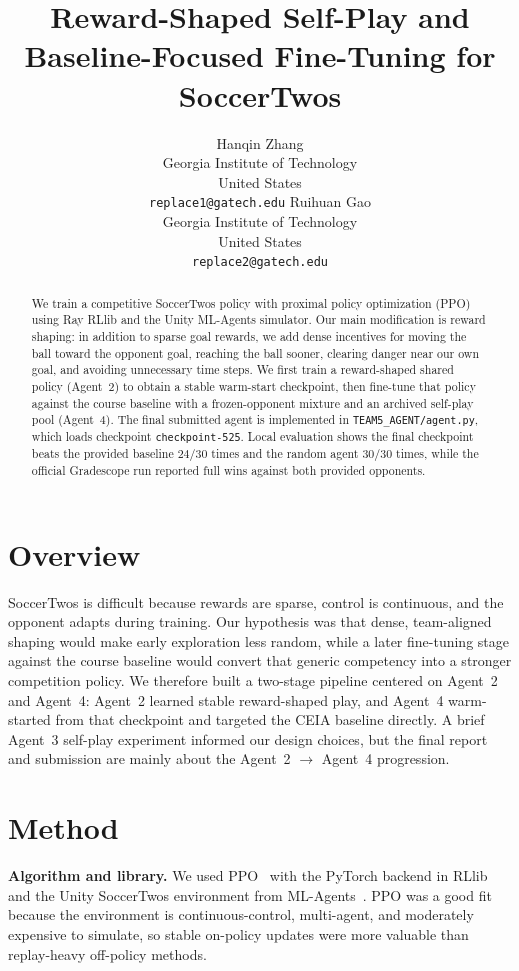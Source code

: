 \documentclass{article}
\title{Reward-Shaped Self-Play and Baseline-Focused Fine-Tuning for SoccerTwos}
\author{
  Hanqin Zhang\\
  Georgia Institute of Technology\\
  United States\\
  \texttt{replace1@gatech.edu}
  \And
  Ruihuan Gao\\
  Georgia Institute of Technology\\
  United States\\
  \texttt{replace2@gatech.edu}
}
\begin{document}
\maketitle

\begin{abstract}
We train a competitive SoccerTwos policy with proximal policy optimization (PPO) using Ray RLlib and the Unity ML-Agents simulator. Our main modification is reward shaping: in addition to sparse goal rewards, we add dense incentives for moving the ball toward the opponent goal, reaching the ball sooner, clearing danger near our own goal, and avoiding unnecessary time steps. We first train a reward-shaped shared policy (Agent~2) to obtain a stable warm-start checkpoint, then fine-tune that policy against the course baseline with a frozen-opponent mixture and an archived self-play pool (Agent~4). The final submitted agent is implemented in \texttt{TEAM5\_AGENT/agent.py}, which loads checkpoint \texttt{checkpoint-525}. Local evaluation shows the final checkpoint beats the provided baseline $24/30$ times and the random agent $30/30$ times, while the official Gradescope run reported full wins against both provided opponents.
\end{abstract}


\section{Overview}
SoccerTwos is difficult because rewards are sparse, control is continuous, and the opponent adapts during training. Our hypothesis was that dense, team-aligned shaping would make early exploration less random, while a later fine-tuning stage against the course baseline would convert that generic competency into a stronger competition policy. We therefore built a two-stage pipeline centered on Agent~2 and Agent~4: Agent~2 learned stable reward-shaped play, and Agent~4 warm-started from that checkpoint and targeted the CEIA baseline directly. A brief Agent~3 self-play experiment informed our design choices, but the final report and submission are mainly about the Agent~2 $\rightarrow$ Agent~4 progression.

\section{Method}
\textbf{Algorithm and library.} We used PPO~\citep{schulman2017ppo} with the PyTorch backend in RLlib~\citep{liang2018rllib} and the Unity SoccerTwos environment from ML-Agents~\citep{juliani2020mlagents}. PPO was a good fit because the environment is continuous-control, multi-agent, and moderately expensive to simulate, so stable on-policy updates were more valuable than replay-heavy off-policy methods.
\end{document}
